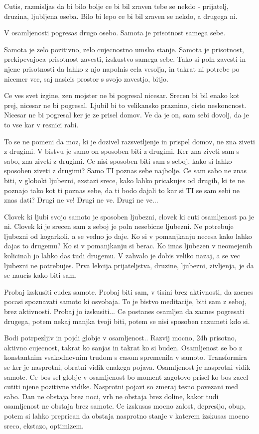 Cutis, razmisljas da bi bilo bolje ce bi bil zraven tebe se nekdo - prijatelj, druzina, ljubljena oseba. Bilo bi lepo ce bi bil zraven se nekdo, a drugega ni. 

V osamljenosti pogresas drugo osebo. Samota je prisotnost samega sebe. 

Samota je zelo pozitivno, zelo cujecnostno umsko stanje. Samota je prisotnost, prekipevajoca prisotnost zavesti, izskustvo samega sebe. Tako si poln zavesti in njene prisotnosti da lahko z njo napolnis cela vesolja, in takrat ni potrebe po nicemer vec, saj nasicis prostor s svojo zavestjo, bitjo. 

Ce ves svet izgine, zen mojster ne bi pogresal nicesar. Srecen bi bil enako kot prej, nicesar ne bi pogresal. Ljubil bi to velikansko praznino, cisto neskoncnost. Nicesar ne bi pogresal ker je ze prisel domov. Ve da je on, sam sebi dovolj, da je to vse kar v resnici rabi. 

To se ne pomeni da moz, ki je dozivel razsvetljenje in prispel domov, ne zna ziveti z drugimi. V bistvu je samo on sposoben biti z drugimi. Ker zna ziveti sam s sabo, zna ziveti z drugimi. Ce nisi sposoben biti sam s seboj, kako si lahko sposoben ziveti z drugimi? Samo TI poznas sebe najbolje. Ce sam sabo ne znas biti, v globoki ljubezni, exstazi srece, kako lahko pricakujes od drugih, ki te ne poznajo tako kot ti poznas sebe, da ti bodo dajali to kar si TI se sam sebi ne znas dati? Drugi ne ve! Drugi ne ve. Drugi ne ve... 

Clovek ki ljubi svojo samoto je sposoben ljubezni, clovek ki cuti osamljenost pa je ni. Clovek ki je srecen sam z seboj je poln nesebicne ljubezni. Ne potrebuje ljubezni od kogarkoli, a se vedno jo daje. Ko si v pomanjkanju necesa kako lahko dajas to drugemu? Ko si v pomanjkanju si berac. Ko imas ljubezen v neomejenih kolicinah jo lahko das tudi drugemu. V zahvalo je dobis veliko nazaj, a se vec ljubezni ne potrebujes.  Prva lekcija prijateljstva, druzine, ljubezni, zivljenja, je da se naucis kako biti sam. 

Probaj izskusiti cudez samote. Probaj biti sam, v tisini brez aktivnosti, da zacnes pocasi spoznavati samoto ki osvobaja. To je bistvo meditacije, biti sam z seboj, brez aktivnosti. Probaj jo izskusiti... Ce postanes osamljen da zacnes pogresati drugega, potem nekaj manjka tvoji biti, potem se nisi sposoben razumeti kdo si. 

Bodi potrpezljiv in pojdi globje v osamljenost.. Razvij mocno, 24h prisotno, aktivno cujecnost, takrat ko sanjas in takrat ko si buden. Osamljenost se bo z konstantnim vsakodnevnim trudom s casom spremenila v samoto. Transformira se ker je nasprotni, obratni vidik enakega pojava. Osamljenost je nasprotni vidik samote. Ce bos sel globje v osamljenost bo moment zagotovo prisel ko bos zacel cutiti njene pozitivne vidike. Nasprotni pojavi so zmeraj tesno povezani med sabo. Dan ne obstaja brez noci, vrh ne obstaja brez doline, kakor tudi osamljenost ne obstaja brez samote. Ce izskusas mocno zalost, depresijo, obup, potem si lahko preprican da obstaja nasprotno stanje v katerem izskusas mocno sreco, ekstazo, optimizem. 

